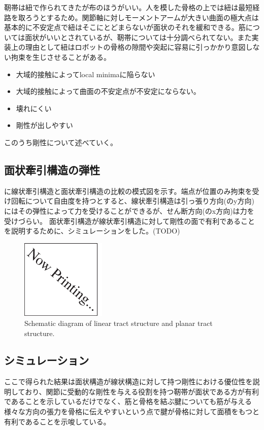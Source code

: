 \documentclass{jarticle}
\begin{document}
靭帯は紐で作られてきたが布のほうがいい。人を模した骨格の上では紐は最短経路を取ろうとするため。関節軸に対しモーメントアームが大きい曲面の極大点は基本的に不安定点で紐はそこにとどまらないが面状のそれを緩和できる。筋については面状がいいとされている\cite{Humanoids2011:osada:planar}が、靭帯については十分調べられてない。また実装上の理由として紐はロボットの骨格の隙間や突起に容易に引っかかり意図しない拘束を生じさせることがある。
\begin{itemize}
\item 大域的接触によってlocal minimaに陥らない
\item 大域的接触によって曲面の不安定点が不安定にならない。
\item 壊れにくい
\item 剛性が出しやすい
\end{itemize}
このうち剛性について述べていく。

\subsection{面状牽引構造の弾性}
に線状牽引構造と面状牽引構造の比較の模式図を示す。端点が位置のみ拘束を受け回転について自由度を持つとすると、線状牽引構造は引っ張り方向(のy方向)にはその弾性によって力を受けることができるが、せん断方向(のx方向)は力を受けづらい。
面状牽引構造が線状牽引構造に対して剛性の面で有利であることを説明するために、シミュレーションをした。(TODO)

\begin{figure}[tb]
 \centering
  \includegraphics[height=38mm]{figs/nowprinting.eps}
  \vspace*{-4mm}
  \caption{Schematic diagram of linear tract structure and planar tract structure.}
  \label{fig:schema}
\end{figure}

\subsection{シミュレーション}
ここで得られた結果は面状構造が線状構造に対して持つ剛性における優位性を説明しており、関節に受動的な剛性を与える役割を持つ靭帯が面状である方が有利であることを示しているだけでなく、筋と骨格を結ぶ腱についても筋が与える様々な方向の張力を骨格に伝えやすいという点で腱が骨格に対して面積をもつと有利であることを示唆している。
\end{document}

